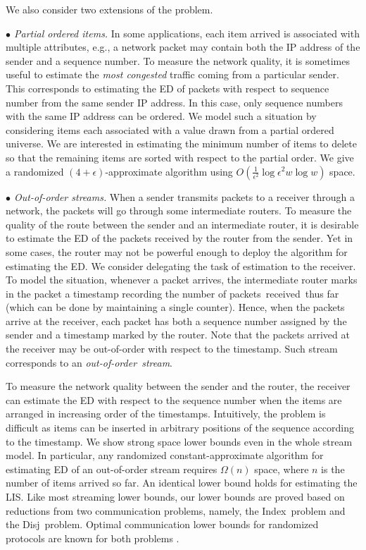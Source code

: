 \documentclass{llncs}
\newcommand{\ind}{{\sc Index}}
\newcommand{\disj}{{\sc Disj}}
\begin{document}
We also consider two extensions of the problem.

{\it $\bullet$ Partial ordered items.}
In some applications, each item arrived is associated
with multiple attributes, e.g., a network packet may contain
both the IP address of the sender and a sequence number.
To measure the network quality,
it is sometimes useful to estimate the \emph{most congested} traffic
coming from a particular sender.
This corresponds to estimating the ED of packets
with respect to sequence number from the same sender IP address.
In this case,
only sequence numbers with the same IP address can be ordered.
We model such a situation by considering items
each associated with a value drawn from a partial ordered universe.
We are interested in estimating the minimum number of
items to delete so that the remaining items are sorted
with respect to the partial order. We give a randomized $(4+\epsilon)$-approximate algorithm
using $O( \frac{1}{\epsilon^2} \log \epsilon^2 w \log w)$ space.


{\it $\bullet$ Out-of-order streams.}
When a sender transmits packets to a receiver through
a network, the packets will go through some intermediate routers.
To measure the quality of the route between
the sender and an intermediate router,
it is desirable to estimate the ED of the packets received
by the router from the sender.
Yet in some cases, the router may not be powerful enough to deploy
the algorithm for estimating the ED.
We consider delegating the task of estimation
to the receiver.
To model the situation, whenever a packet arrives,
the intermediate router marks in the packet a timestamp recording
the number of packets~received~thus far
(which can be done by maintaining a single counter).
Hence, when the packets
arrive at the receiver, each packet has both a sequence number
assigned by the sender and a timestamp marked by the router.
Note that the packets arrived at the receiver may be out-of-order
with respect to the timestamp.
Such stream corresponds to an \emph{out-of-order~stream}.

To measure the
network quality between the sender and the router,
the receiver can estimate the ED with respect to the sequence number
when the items are arranged in increasing order of the timestamps.
Intuitively, the problem is difficult as items can
be inserted in arbitrary positions of the sequence according
to the timestamp.
We show strong space lower bounds even in the whole stream model.
In particular, any randomized constant-approximate
algorithm for estimating ED of an out-of-order stream requires $\Omega( n )$ space,
where $n$ is the number of items arrived so far.
An identical lower bound holds for estimating the LIS.
Like most streaming lower bounds, our lower bounds are proved based on
reductions from two communication problems, namely, the \ind~problem and the
\disj~problem.  Optimal communication lower bounds for randomized protocols are
known for both problems \cite{Abl96,Jay09}.
\end{document}
